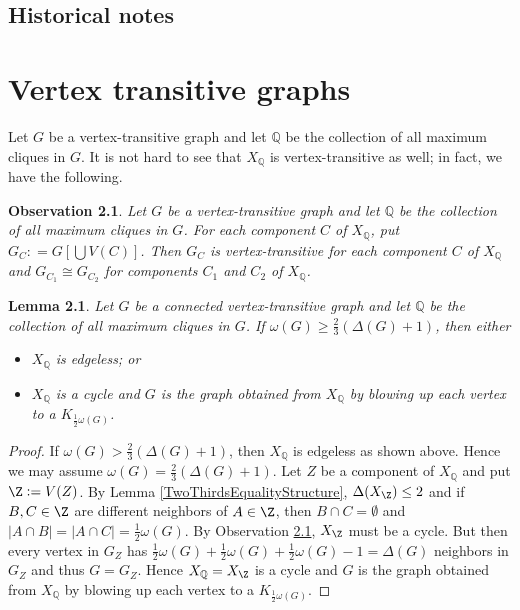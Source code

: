 \documentclass{tufte-book} %
\theoremstyle{plain}
\newtheorem{lemma}{Lemma}
\newtheorem{observation}{Observation}
\newcommand{\card}[1]{\left|#1\right|}
\newcommand{\parens}[1]{\left( #1 \right)}
\newcommand{\brackets}[1]{\left[ #1 \right]}
\newcommand{\DefinedAs}{\mathrel{\mathop:}=}
\newcommand{\Q}{\mathbb{Q}}
\begin{document}
\section{Historical notes}

\chapter{Vertex transitive graphs}
Let $G$ be a vertex-transitive graph and let $\Q$ be the collection of all
maximum cliques in $G$.  It is not hard to see that $X_\Q$ is vertex-transitive
as well; in fact, we have the following.

\begin{observation}\label{transitiveClustering}
Let $G$ be a vertex-transitive graph and let $\Q$ be the collection of all
maximum cliques in $G$.  For each component $C$ of $X_\Q$, put $G_C \DefinedAs
G\brackets{\bigcup V(C)}$.  Then $G_C$ is vertex-transitive for each component
$C$ of $X_\Q$ and $G_{C_1} \cong G_{C_2}$ for components $C_1$ and $C_2$ of
$X_\Q$.
\end{observation}

\begin{lemma}\label{TransitiveClusteringBigCliques}
Let $G$ be a connected vertex-transitive graph and let $\Q$ be the collection
of all maximum cliques in $G$.  If $\omega(G) \ge \frac23 \parens{\Delta(G) +
1}$, then either
\begin{itemize}
\item $X_\Q$ is edgeless; or
\item $X_\Q$ is a cycle and $G$ is the graph obtained from $X_\Q$ by blowing up each vertex to a $K_{\frac12 \omega(G)}$.
\end{itemize}
\end{lemma}
\begin{proof}
If $\omega(G) > \frac23 \parens{\Delta(G) + 1}$, then $X_\Q$ is edgeless as shown above.  Hence we may assume $\omega(G) = \frac23 \parens{\Delta(G) + 1}$.  
Let $Z$ be a component of $X_\Q$ and put $\Z \DefinedAs V(Z)$.
By Lemma \ref{TwoThirdsEqualityStructure}, $\Delta(X_\Z) \le 2$ and if $B, C \in \Z$ are 
different neighbors of $A \in \Z$, then $B \cap C = \emptyset$ and $\card{A \cap B} = \card{A \cap C} = \frac12 \omega(G)$.  
By Observation \ref{transitiveClustering}, $X_\Z$ must be a cycle.  But then every vertex in $G_Z$ has 
$\frac12 \omega(G) + \frac12 \omega(G) + \frac12 \omega(G) - 1 = \Delta(G)$ neighbors in $G_Z$ and thus $G = G_Z$.  
Hence $X_\Q = X_\Z$ is a cycle and $G$ is the graph obtained from $X_\Q$ by blowing up each vertex to a $K_{\frac12 \omega(G)}$.
\end{proof}
\end{document}
